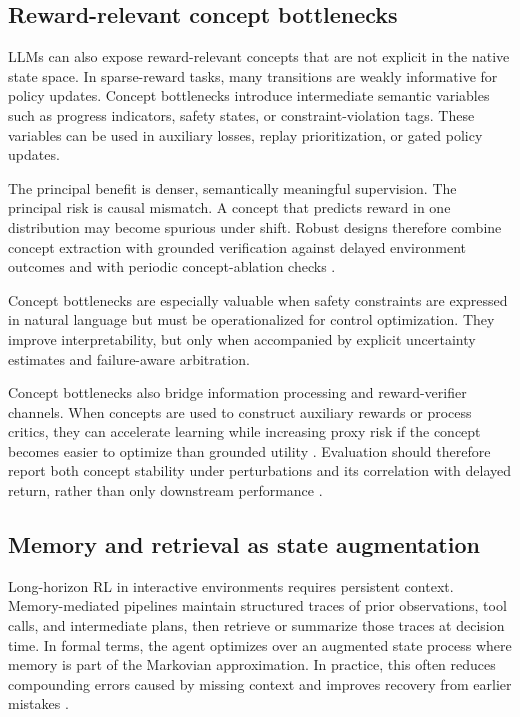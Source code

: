 ﻿\documentclass[conference]{IEEEtran}
\begin{document}
\subsection{Reward-relevant concept bottlenecks}
LLMs can also expose reward-relevant concepts that are not explicit in the native state space. In sparse-reward tasks, many transitions are weakly informative for policy updates. Concept bottlenecks introduce intermediate semantic variables such as progress indicators, safety states, or constraint-violation tags. These variables can be used in auxiliary losses, replay prioritization, or gated policy updates.

The principal benefit is denser, semantically meaningful supervision. The principal risk is causal mismatch. A concept that predicts reward in one distribution may become spurious under shift. Robust designs therefore combine concept extraction with grounded verification against delayed environment outcomes and with periodic concept-ablation checks \cite{arxiv_p_2303_00001,arxiv_p_2309_06687,arxiv_p_2510_10197,arxiv_p_2601_15690}.

Concept bottlenecks are especially valuable when safety constraints are expressed in natural language but must be operationalized for control optimization. They improve interpretability, but only when accompanied by explicit uncertainty estimates and failure-aware arbitration.

Concept bottlenecks also bridge information processing and reward-verifier channels. When concepts are used to construct auxiliary rewards or process critics, they can accelerate learning while increasing proxy risk if the concept becomes easier to optimize than grounded utility \cite{arxiv_p_2310_12931,arxiv_p_2602_06493,arxiv_p_2602_12579}. Evaluation should therefore report both concept stability under perturbations and its correlation with delayed return, rather than only downstream performance \cite{doi_p_10_3390_app14198868,arxiv_p_2411_02337,arxiv_p_2602_14234}.

\subsection{Memory and retrieval as state augmentation}
Long-horizon RL in interactive environments requires persistent context. Memory-mediated pipelines maintain structured traces of prior observations, tool calls, and intermediate plans, then retrieve or summarize those traces at decision time. In formal terms, the agent optimizes over an augmented state process where memory is part of the Markovian approximation. In practice, this often reduces compounding errors caused by missing context and improves recovery from earlier mistakes \cite{arxiv_p_2404_03648,arxiv_p_2511_14460,arxiv_p_2602_00994,arxiv_p_2601_07264}.
\end{document}

